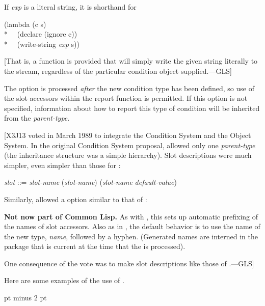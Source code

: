 \begin{defmac}
\begin{flushdesc}
     If {\it exp} is a literal string, it is shorthand for
\begin{lisp}
(lambda (c s) \\*
~~(declare (ignore c)) \\*
~~(write-string {\it exp} s))
\end{lisp}
     [That is, a function is provided that will simply write the given string literally
     to the stream, regardless of the particular condition object supplied.---GLS]

     The  option is processed {\it after} the new condition type has been defined,
     so use of the slot accessors within the report function is permitted.
     If this option is not specified, information about how to report this
     type of condition will be inherited from the {\it parent-type}.
\end{flushdesc}

[X3J13 voted in March 1989  to integrate the
Condition System and the Object System.
In the original Condition System proposal, 
allowed only one {\it parent-type} (the inheritance structure was a simple
hierarchy).
Slot descriptions were much simpler, even simpler than those for :
\begin{tabbing}
{\it slot} ::= {\it slot-name} {\Mor} ({\it slot-name}) {\Mor} ({\it slot-name} {\it default-value})
\end{tabbing}
Similarly,  allowed
a  option similar to that of :
\begin{flushdesc}
\item[\cd{(:conc-name {\it symbol-or-string})}]

     {\bf Not now part of Common Lisp.}
     As with , this sets up automatic prefixing of the names 
     of slot accessors. Also as in , the default behavior 
     is to use the name of the new type, {\it name}, followed by a hyphen.
     (Generated names are interned in the package that is current at the time that the 
      is processed).
\end{flushdesc}
One consequence of the vote was to make  slot descriptions
like those of .---GLS]

Here are some examples of the use of .

 pt minus 2 pt


\end{defmac}
